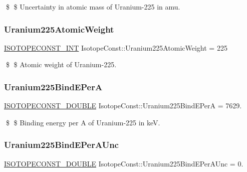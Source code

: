 \$ \$ Uncertainty in atomic mass of Uranium-\/225 in amu. \mbox{\label{group___isotope_const-_uranium-_u225_ga02245fda5c9f57b70ccb1bc00bd88c30}} 
\subsubsection{\texorpdfstring{Uranium225\+Atomic\+Weight}{Uranium225AtomicWeight}}
{\footnotesize\ttfamily \mbox{\hyperlink{group___isotope_const-_macros_ga5f18360b3e99483a35c32d789e62621c}{I\+S\+O\+T\+O\+P\+E\+C\+O\+N\+S\+T\+\_\+\+I\+NT}} Isotope\+Const\+::\+Uranium225\+Atomic\+Weight = 225}

\$ \$ Atomic weight of Uranium-\/225. \mbox{\label{group___isotope_const-_uranium-_u225_gaa7799124b2f57ae6acff7acaafc98e44}} 
\subsubsection{\texorpdfstring{Uranium225\+Bind\+E\+PerA}{Uranium225BindEPerA}}
{\footnotesize\ttfamily \mbox{\hyperlink{group___isotope_const-_macros_ga8f45a7272ce02c0b4c65c44636ed719a}{I\+S\+O\+T\+O\+P\+E\+C\+O\+N\+S\+T\+\_\+\+D\+O\+U\+B\+LE}} Isotope\+Const\+::\+Uranium225\+Bind\+E\+PerA = 7629.}

\$ \$ Binding energy per A of Uranium-\/225 in keV. \mbox{\label{group___isotope_const-_uranium-_u225_ga11da3edb61ad20f9e5570a0c4a6632e0}} 
\subsubsection{\texorpdfstring{Uranium225\+Bind\+E\+Per\+A\+Unc}{Uranium225BindEPerAUnc}}
{\footnotesize\ttfamily \mbox{\hyperlink{group___isotope_const-_macros_ga8f45a7272ce02c0b4c65c44636ed719a}{I\+S\+O\+T\+O\+P\+E\+C\+O\+N\+S\+T\+\_\+\+D\+O\+U\+B\+LE}} Isotope\+Const\+::\+Uranium225\+Bind\+E\+Per\+A\+Unc = 0.}

